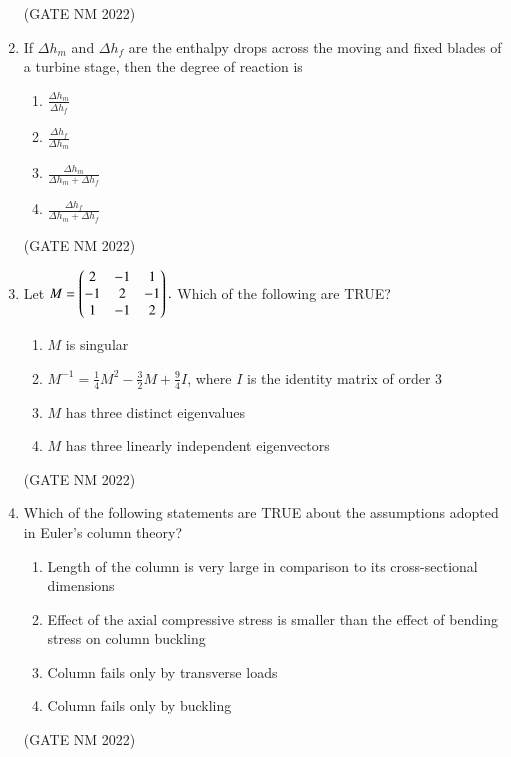\documentclass[journal,12pt,onecolumn]{IEEEtran}
\theoremstyle{remark}
\begin{document}
\begin{enumerate}
\hfill(GATE NM 2022)

\item  If $\Delta h_m$ and $\Delta h_f$ are the enthalpy drops across the moving and fixed blades of a turbine stage, then the degree of reaction is
	\begin{multicols}{4}
\begin{enumerate}
    \item $\frac{\Delta h_m}{ \Delta h_f}$
    \item $\frac{\Delta h_f}{\Delta h_m }$
    \item $\frac{\Delta h_m }{\Delta h_m + \Delta h_f}$
    \item $\frac{\Delta h_f }{\Delta h_m + \Delta h_f}$
\end{enumerate}
	\end{multicols}

\hfill(GATE NM 2022)

\item  Let  
$M=
\begin{pmatrix}2 & -1 & 1 \\
-1 & 2 & -1 \\
1 & -1 & 2\end{pmatrix}.
$
Which of the following are TRUE?
\begin{enumerate}
    \item $M$ is singular
    \item $M^{-1} = {\frac{1}{4}}M^{2} - {\frac{3}{2}}M + {\frac{9}{4}}I $, where $I$ is the identity matrix of order 3
    \item $M$ has three distinct eigenvalues
    \item $M$ has three linearly independent eigenvectors
\end{enumerate}

\hfill(GATE NM 2022)

\item  Which of the following statements are TRUE about the assumptions adopted in Euler's column theory?  
\begin{enumerate}
    \item Length of the column is very large in comparison to its cross-sectional dimensions
    \item Effect of the axial compressive stress is smaller than the effect of bending stress on column buckling
    \item Column fails only by transverse loads
    \item Column fails only by buckling
\end{enumerate}

\hfill(GATE NM 2022)


\end{enumerate}
\end{document}
